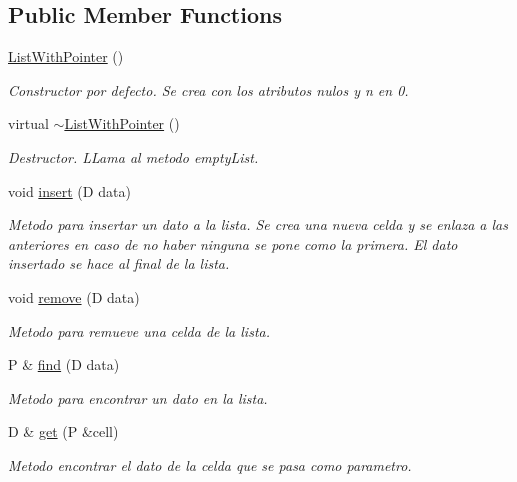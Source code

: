 \subsection*{Public Member Functions}
\begin{DoxyCompactItemize}
\item 
\hyperlink{classListWithPointer_a53b1284b13bf834bc5fc1eb27368a283}{List\+With\+Pointer} ()
\begin{DoxyCompactList}\small\item\em Constructor por defecto. Se crea con los atributos nulos y n en 0. \end{DoxyCompactList}\item 
virtual \hyperlink{classListWithPointer_ac0567286c62e3521fa5130f95010e779}{$\sim$\+List\+With\+Pointer} ()
\begin{DoxyCompactList}\small\item\em Destructor. L\+Lama al metodo empty\+List. \end{DoxyCompactList}\item 
void \hyperlink{classListWithPointer_a726958a731ead3b407d68a7e5a0bce54}{insert} (D data)
\begin{DoxyCompactList}\small\item\em Metodo para insertar un dato a la lista. Se crea una nueva celda y se enlaza a las anteriores en caso de no haber ninguna se pone como la primera. El dato insertado se hace al final de la lista. \end{DoxyCompactList}\item 
void \hyperlink{classListWithPointer_ab69e83d9e92619be09f9d8dde3e6cad0}{remove} (D data)
\begin{DoxyCompactList}\small\item\em Metodo para remueve una celda de la lista. \end{DoxyCompactList}\item 
P \& \hyperlink{classListWithPointer_a28695477b0cfdc456271e31f5e0d6429}{find} (D data)
\begin{DoxyCompactList}\small\item\em Metodo para encontrar un dato en la lista. \end{DoxyCompactList}\item 
D \& \hyperlink{classListWithPointer_af2892238e8faed0b98d2473419a91f62}{get} (P \&cell)
\begin{DoxyCompactList}\small\item\em Metodo encontrar el dato de la celda que se pasa como parametro. \end{DoxyCompactList}\item 

\end{DoxyCompactItemize}
